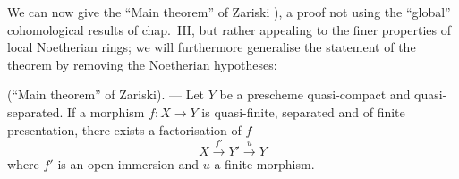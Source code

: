 \begin{env}[8.12.5]
\label{IV.8.12.5}
We can now give the ``Main theorem'' of Zariski ), a proof not using the ``global'' cohomological results of chap.~III, but rather appealing to the finer properties of local Noetherian rings; we will furthermore generalise the statement of the theorem by removing the Noetherian hypotheses:
\end{env}

\begin{theorem}[8.12.6]
\label{IV.8.12.6}
(``Main theorem'' of Zariski). --- Let $Y$ be a prescheme quasi-compact and quasi-separated.
If a morphism $f:X\to Y$ is quasi-finite, separated and of finite presentation, there exists a factorisation of $f$
\begin{equation}
\label{IV.8.12.6.1}
X\xrightarrow{f'}Y'\xrightarrow{u}Y \tag{8.12.6.1}
\end{equation}
where $f'$ is an open immersion and $u$ a finite morphism.
\end{theorem}


